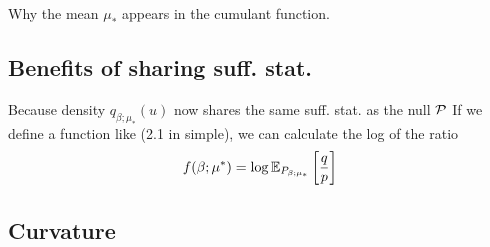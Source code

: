 Why the mean $\mu_*$ appears in the cumulant function. 

\subsection{Benefits of sharing suff. stat.}

Because density $q_{\beta;\mu_*}(u)$ now shares the same suff. stat. as the null $\mathcal{P}$
If we define a function like (2.1 in simple), we can calculate the log of the ratio
\begin{equation*}
	f(\beta;\mu^*) = \log \ERWi{P_{\beta;\mu_*}}{\frac{q}{p}}
\end{equation*}

\subsection{Curvature}


%
%
%
%
